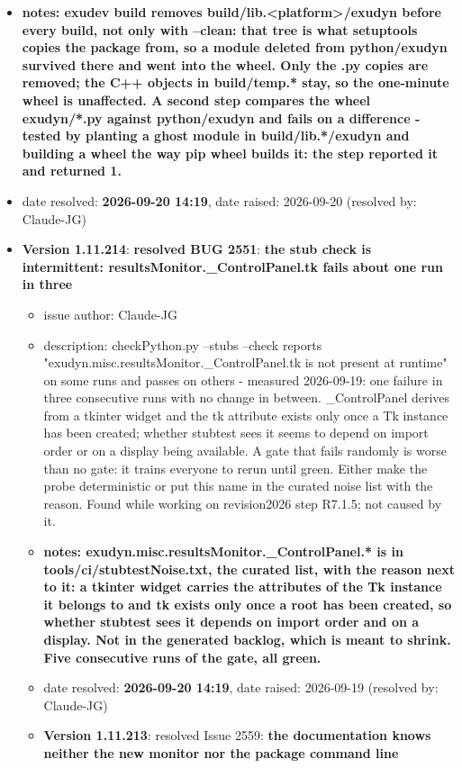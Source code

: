 \begin{itemize}
\begin{itemize}
\begin{itemize}
\begin{itemize}
\begin{itemize}
\begin{itemize}
\begin{itemize}
    \item {\bf notes: exudev build removes build/lib.<platform>/exudyn before every build, not only with --clean: that tree is what setuptools copies the package from, so a module deleted from python/exudyn survived there and went into the wheel. Only the .py copies are removed; the C++ objects in build/temp.* stay, so the one-minute wheel is unaffected. A second step compares the wheel exudyn/*.py against python/exudyn and fails on a difference - tested by planting a ghost module in build/lib.*/exudyn and building a wheel the way pip wheel builds it: the step reported it and returned 1.}
    \item   date resolved: {\bf 2026-09-20 14:19},
date raised: 2026-09-20 (resolved by: Claude-JG)
  \ei
  \item[] {\bf Version 1.11.214}: {\bf \color{warningRed}  resolved BUG 2551}: {\bf the stub check is intermittent: resultsMonitor.\_ControlPanel.tk fails about one run in three}
\vspace{-6pt}   \begin{itemize} \setlength\itemsep{-1pt}
    \item issue author: Claude-JG
    \item {description: checkPython.py --stubs --check reports "exudyn.misc.resultsMonitor.\_ControlPanel.tk is not present at runtime" on some runs and passes on others - measured 2026-09-19: one failure in three consecutive runs with no change in between. \_ControlPanel derives from a tkinter widget and the tk attribute exists only once a Tk instance has been created; whether stubtest sees it seems to depend on import order or on a display being available. A gate that fails randomly is worse than no gate: it trains everyone to rerun until green. Either make the probe deterministic or put this name in the curated noise list with the reason. Found while working on revision2026 step R7.1.5; not caused by it.}
    \item {\bf notes: exudyn.misc.resultsMonitor.\_ControlPanel.* is in tools/ci/stubtestNoise.txt, the curated list, with the reason next to it: a tkinter widget carries the attributes of the Tk instance it belongs to and tk exists only once a root has been created, so whether stubtest sees it depends on import order and on a display. Not in the generated backlog, which is meant to shrink. Five consecutive runs of the gate, all green.}
    \item   date resolved: {\bf 2026-09-20 14:19},
date raised: 2026-09-19 (resolved by: Claude-JG)
  \ei
  \item[] {\bf Version 1.11.213}:  resolved Issue 2559: {\bf the documentation knows neither the new monitor nor the package command line}

\end{itemize}
\end{itemize}
\end{itemize}
\end{itemize}
\end{itemize}
\end{itemize}
\end{itemize}
\end{itemize}
